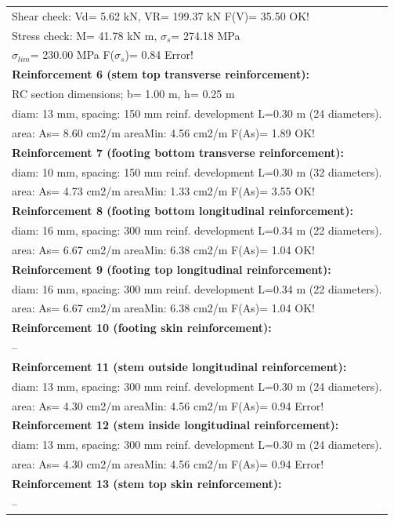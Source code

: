 \begin{center}
\begin{supertabular}[H]{|l|}
  Shear check: Vd=   5.62 kN,  VR= 199.37 kN  F(V)= 35.50 OK!\\
  Stress check: M=  41.78 kN m, $\sigma_s$= 274.18 MPa\\
    $\sigma_{lim}$= 230.00 MPa  F($\sigma_s$)= 0.84 Error!\\
\textbf{Reinforcement 6 (stem top transverse reinforcement):}\\
  RC section dimensions; b= 1.00 m, h= 0.25 m\\
  diam: 13 mm, spacing: 150 mm  reinf. development L=0.30 m (24 diameters).\\
  area: As=   8.60 cm2/m areaMin:   4.56 cm2/m  F(As)= 1.89 OK!\\
\textbf{Reinforcement 7 (footing bottom transverse reinforcement):}\\
  diam: 10 mm, spacing: 150 mm  reinf. development L=0.30 m (32 diameters).\\
  area: As=   4.73 cm2/m areaMin:   1.33 cm2/m  F(As)= 3.55 OK!\\
\textbf{Reinforcement 8 (footing bottom longitudinal reinforcement):}\\
  diam: 16 mm, spacing: 300 mm  reinf. development L=0.34 m (22 diameters).\\
  area: As=   6.67 cm2/m areaMin:   6.38 cm2/m  F(As)= 1.04 OK!\\
\textbf{Reinforcement 9 (footing top longitudinal reinforcement):}\\
  diam: 16 mm, spacing: 300 mm  reinf. development L=0.34 m (22 diameters).\\
  area: As=   6.67 cm2/m areaMin:   6.38 cm2/m  F(As)= 1.04 OK!\\
\textbf{Reinforcement 10 (footing skin reinforcement):}\\
  --\\
\textbf{Reinforcement 11 (stem outside longitudinal reinforcement):}\\
  diam: 13 mm, spacing: 300 mm  reinf. development L=0.30 m (24 diameters).\\
  area: As=   4.30 cm2/m areaMin:   4.56 cm2/m  F(As)= 0.94 Error!\\
\textbf{Reinforcement 12 (stem inside longitudinal reinforcement):}\\
  diam: 13 mm, spacing: 300 mm  reinf. development L=0.30 m (24 diameters).\\
  area: As=   4.30 cm2/m areaMin:   4.56 cm2/m  F(As)= 0.94 Error!\\
\textbf{Reinforcement 13 (stem top skin reinforcement):}\\
  --\\
\hline
\end{supertabular}
\end{center}
